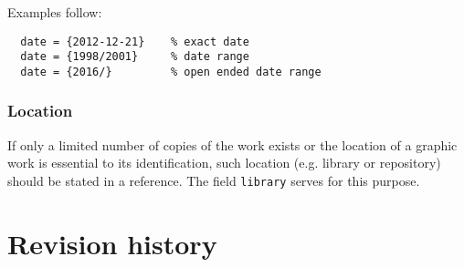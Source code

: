 \documentclass[a4paper,10pt]{ltxdockit}
\def\t|#1|{\texttt{#1}}
\begin{document}
Examples follow:

\begin{verbatim}
  date = {2012-12-21}    % exact date
  date = {1998/2001}     % date range
  date = {2016/}         % open ended date range
\end{verbatim}

\subsubsection{Location}

If only a limited number of copies of the work exists or
the location of a graphic work is essential to its identification,
such location (e.g. library or repository) should be stated
in a reference. The field \t|library| serves for this purpose.

\nocite{*}
\printbibliography[title={Reference bibliography},heading={bibnumbered}]


\section{Revision history}
\end{document}
